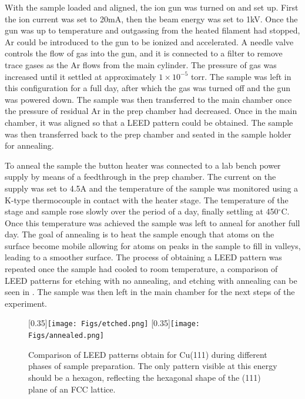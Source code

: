 With the sample loaded and aligned, the ion gun was turned on and set up. First the ion current was set to 20mA, then the beam energy was set to 1kV. Once the gun was up to temperature
and outgassing from the heated filament had stopped, Ar could be introduced to the gun to be ionized and accelerated. A needle valve controls the flow of gas into the gun, and it is 
connected to a filter to remove trace gases as the Ar flows from the main cylinder. The pressure of gas was increased until it settled at approximately $1\times10^{-5}$ torr.
The sample was left in this configuration for a full day, after which the gas was turned off and the gun was powered down. The sample was then transferred to the main chamber once the 
pressure of residual Ar in the prep chamber had decreased. Once in the main chamber, it was aligned so that a LEED pattern could be obtained. The sample was then transferred back to the prep chamber and seated in the sample holder for annealing. 

To anneal the sample the button heater was connected to a lab bench power supply by means of a feedthrough in the prep chamber. The current on the supply was set to 4.5A and the temperature
of the sample was monitored using a K-type thermocouple in contact with the heater stage. The temperature of the stage and sample rose slowly over the period of a day, finally 
settling at 450$^\circ$C. Once this temperature was achieved the sample was left to anneal for another full day. The goal of annealing is to heat the sample enough that atoms on the 
surface become mobile allowing for atoms on peaks in the sample to fill in valleys, leading to a smoother surface\cite{robinson2012argon}. The process of obtaining a LEED pattern was 
repeated once the sample had cooled to room temperature, a comparison of LEED patterns for etching with no annealing, and etching with annealing can be seen in . The sample
was then left in the main chamber for the next steps of the experiment. 

\begin{figure}[h!]
  \centering
  [0.35\linewidth]{\texttt{[image: Figs/etched.png]}}
  [0.35\linewidth]{\texttt{[image: Figs/annealed.png]}}
  \caption{Comparison of LEED patterns obtain for Cu(111) during different phases of sample preparation. The only pattern visible at this energy should be a hexagon, reflecting the 
  hexagonal shape of the (111) plane of an FCC lattice.}
  \label{fig:LEED}
\end{figure}

